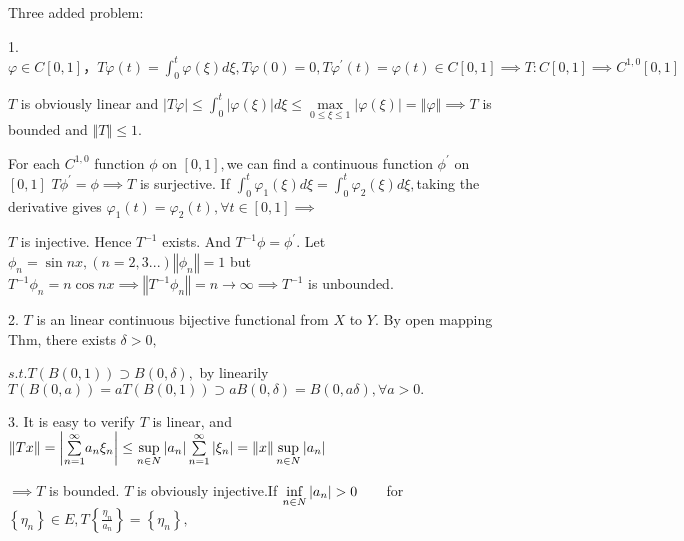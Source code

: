 \documentclass{article}
\begin{document}
Three added problem:

1.$\varphi \in C\left[ 0,1\right] ， T\varphi \left( t\right)
=\int_{0}^{t}\varphi \left( \xi \right) d\xi ,T\varphi \left( 0\right)
=0,T\varphi ^{\prime }\left( t\right) =\varphi \left( t\right) \in C\left[
0,1\right] \implies T:C\left[ 0,1\right] \implies C^{1,0}\left[ 0,1\right] $

$T$ is obviously linear and $\left\vert T\varphi \right\vert \leq
\int_{0}^{t}\left\vert \varphi \left( \xi \right) \right\vert d\xi \leq 
\underset{0\leq \xi \leq 1}{\max }\left\vert \varphi \left( \xi \right)
\right\vert =\left\Vert \varphi \right\Vert \implies T$ is bounded and $%
\left\Vert T\right\Vert \leq 1.$

For each $C^{1,0}$ function $\phi $ on $\left[ 0,1\right] ,$we can find a
continuous function $\phi ^{\prime }$ on $\left[ 0,1\right] $  $T\phi
^{\prime }=\phi \implies T$ is surjective. If $\int_{0}^{t}\varphi
_{1}\left( \xi \right) d\xi =\int_{0}^{t}\varphi _{2}\left( \xi \right) d\xi
,$taking the derivative gives $\varphi _{1}\left( t\right) =\varphi
_{2}\left( t\right) ,\forall t\in \left[ 0,1\right] \implies $

$T$ is injective. Hence $T^{-1}$ exists. And $T^{-1}\phi =\phi ^{\prime }.$%
Let $\phi _{n}=\sin nx,\left( n=2,3...\right) \left\Vert \phi
_{n}\right\Vert =1$ but $T^{-1}\phi _{n}=n\cos nx\implies \left\Vert
T^{-1}\phi _{n}\right\Vert =n\rightarrow \infty \implies T^{-1}$ is
unbounded.

2. $T$ is an linear continuous bijective functional from $X$ to $Y.$ By open
mapping Thm, there exists $\delta >0,$

$s.t.T\left( B\left( 0,1\right) \right) \supset B\left( 0,\delta \right) ,$
by linearily $T\left( B\left( 0,a\right) \right) =aT\left( B\left(
0,1\right) \right) \supset aB\left( 0,\delta \right) =B\left( 0,a\delta
\right) ,\forall a>0.$

3. It is easy to verify $T$ is linear, and $\left\Vert Tx\right\Vert
=\left\vert \underset{n=1}{\overset{\infty }{\sum }}a_{n}\xi _{n}\right\vert
\leq \underset{n\in N}{\sup }\left\vert a_{n}\right\vert \underset{n=1}{%
\overset{\infty }{\sum }}\left\vert \xi _{n}\right\vert =\left\Vert
x\right\Vert \underset{n\in N}{\sup }\left\vert a_{n}\right\vert $

$\implies T$ is bounded. $T$ is obviously injective.If $\underset{n\in N}{%
\inf }\left\vert a_{n}\right\vert >0\qquad $for $\left\{ \eta _{n}\right\}
\in E,T\left\{ \frac{\eta _{n}}{a_{n}}\right\} =\left\{ \eta _{n}\right\} ,$
\end{document}
